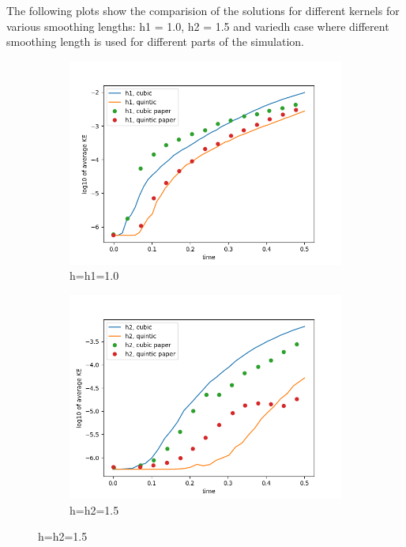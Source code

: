 The following plots show the comparision of the solutions for different kernels for various smoothing lengths: h1 = 1.0, h2 = 1.5 and variedh case where different smoothing length is used for different parts of the simulation.

\begin{figure}[H]
\centering
\begin{subfigure}[b]{0.45\textwidth}
\includegraphics[width=\linewidth]{./case10.png}
\caption{h=h1=1.0}
\end{subfigure}
\begin{subfigure}[b]{0.45\textwidth}
\includegraphics[width=\linewidth]{./case11.png}
\caption{h=h2=1.5}
\end{subfigure}


\end{figure}
